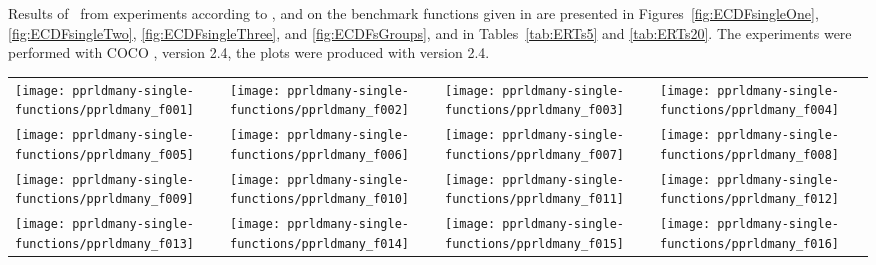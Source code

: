 \documentclass[sigconf]{acmart}
\newcommand{\change}[1]{{\color{red} #1}}
\begin{document}
Results of \algname\ from experiments according to \cite{hansen2016exp}, \cite{hansen2016perfass} and \cite{biobj2016perfass} on the benchmark
functions given in \cite{biobj2016func} are presented in
Figures~\ref{fig:ECDFsingleOne}, \ref{fig:ECDFsingleTwo}, \ref{fig:ECDFsingleThree}, and \ref{fig:ECDFsGroups}, and in
Tables~\ref{tab:ERTs5} and \ref{tab:ERTs20}. The experiments were performed with COCO \cite{hansen2020cocoplat}, version \change{2.4}, the plots were produced with version \change{2.4}.



\begin{figure*}
\centering
\begin{tabular}{@{\hspace*{-0.018\textwidth}}l@{\hspace*{-0.02\textwidth}}l@{\hspace*{-0.02\textwidth}}l@{\hspace*{-0.02\textwidth}}l@{\hspace*{-0.02\textwidth}}}
\texttt{[image: pprldmany-single-functions/pprldmany\_f001]}&
\texttt{[image: pprldmany-single-functions/pprldmany\_f002]}&
\texttt{[image: pprldmany-single-functions/pprldmany\_f003]}&
\texttt{[image: pprldmany-single-functions/pprldmany\_f004]}\\
\texttt{[image: pprldmany-single-functions/pprldmany\_f005]}&
\texttt{[image: pprldmany-single-functions/pprldmany\_f006]}&
\texttt{[image: pprldmany-single-functions/pprldmany\_f007]}&
\texttt{[image: pprldmany-single-functions/pprldmany\_f008]}\\
\texttt{[image: pprldmany-single-functions/pprldmany\_f009]}&
\texttt{[image: pprldmany-single-functions/pprldmany\_f010]}&
\texttt{[image: pprldmany-single-functions/pprldmany\_f011]}&
\texttt{[image: pprldmany-single-functions/pprldmany\_f012]}\\
\texttt{[image: pprldmany-single-functions/pprldmany\_f013]}&
\texttt{[image: pprldmany-single-functions/pprldmany\_f014]}&
\texttt{[image: pprldmany-single-functions/pprldmany\_f015]}&
\texttt{[image: pprldmany-single-functions/pprldmany\_f016]}\\[-1.8ex]
\end{tabular}
 \caption{\label{fig:ECDFsingleOne}
}

\end{figure*}
\end{document}

